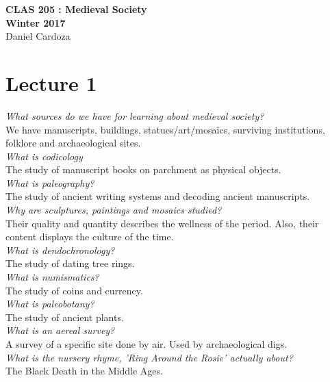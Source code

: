 \documentclass[12pt]{article}
\begin{document}
\begin{center}
	{\Large\bf CLAS 205 : Medieval Society}\\
	\vspace{2mm}
	{\Large\bf Winter 2017}\\
	\vspace{4mm}
	{Daniel Cardoza}\\
\end{center}

\section*{Lecture 1}
\setlength{\parindent}{0pt}

\textit{What sources do we have for learning about medieval society?}\\
We have manuscripts, buildings, statues/art/mosaics, surviving institutions, folklore and archaeological sites.\\

\textit{What is codicology}\\
The study of manuscript books on parchment as physical objects.\\

\textit{What is paleography?}\\
The study of ancient writing systems and decoding ancient manuscripts.\\

\textit{Why are sculptures, paintings and mosaics studied?}\\
Their quality and quantity describes the wellness of the period. Also, their content displays the culture of the time.\\

\textit{What is dendochronology?}\\
The study of dating tree rings.\\

\textit{What is numismatics?}\\
The study of coins and currency.\\

\textit{What is paleobotany?}\\
The study of ancient plants.\\

\textit{What is an aereal survey?}\\
A survey of a specific site done by air. Used by archaeological digs.\\

\textit{What is the nursery rhyme, 'Ring Around the Rosie' actually about?}\\
The Black Death in the Middle Ages.\\
\end{document}
